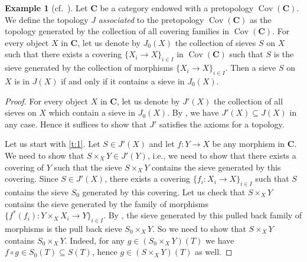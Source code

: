 \documentclass[12pt,reqno,a4paper]{amsart}
\theoremstyle{plain}
\theoremstyle{definition}
\newtheorem{exmp}[thm]{Example}
\theoremstyle{remark}
\begin{document}
\begin{exmp}[{cf.~\cite[\href{https://stacks.math.columbia.edu/tag/00ZD}{Tag 00ZD}]{stacks-project}}]\label{exmp:associated}
  Let $\mathbf{C}$ be a category endowed with a pretopology $\operatorname{Cov}(\mathbf{C})$.
  We define the topology $J$ \textit{associated} to the pretopology $\operatorname{Cov}(\mathbf{C})$ as the topology generated by the collection of all covering families in $\operatorname{Cov}(\mathbf{C})$.
  For every object $X$ in $\mathbf{C}$, let us denote by $J_{0}(X)$ the collection of sieves $S$ on $X$ such that there exists a covering $\{ X_{i} \to X\}_{i \in I}$ in $\operatorname{Cov}(\mathbf{C})$ such that $S$ is the sieve generated by the collection of morphisms $\{ X_{i} \to X \}_{i \in I}$.
  Then a sieve $S$ on $X$ is in $J(X)$ if and only if it contains a sieve in $J_{0}(X)$.
  \begin{proof}
    For every object $X$ in $\mathbf{C}$, let us denote by $J'(X)$ the collection of all sieves on $X$ which contain a sieve in $J_{0}(X)$.
    By , we have $J'(X) \subseteq J(X)$ in any case.
    Hence it suffices to show that $J'$ satisfies the axioms for a topology.

    Let us start with \ref{t:1}.
    Let $S \in J'(X)$ and let $f \colon Y \to X$ be any morphism in $\mathbf{C}$.
    We need to show that $S \times_{X} Y \in J'(Y)$, i.e., we need to show that there exists a covering of $Y$ such that the sieve $S \times_{X} Y$ contains the sieve generated by this covering.
    Since $S \in J'(X)$, there exists a covering $\{ f_{i} \colon X_{i} \to X \}_{i \in I}$ such that $S$ contains the sieve $S_{0}$ generated by this covering.
    Let us check that $S \times_{X} Y$ contains the sieve generated by the family of morphisms $\{ f^{*}(f_{i}) \colon Y \times_{X} X_{i} \to Y \}_{i \in I}$.
    By , the sieve generated by this pulled back family of morphisms is the pull back sieve $S_{0} \times_{X} Y$.
    So we need to show that $S \times_{X} Y$ contains $S_{0} \times_{X} Y$.
    Indeed, for any $g \in (S_{0} \times_{X} Y)(T)$ we have $f \circ g \in S_{0}(T) \subseteq S(T)$, hence $g \in (S \times_{X} Y)(T)$ as well.


\end{proof}
\end{exmp}
\end{document}
